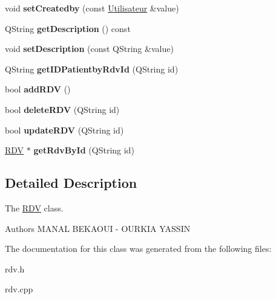 \begin{DoxyCompactItemize}
\item 
\mbox{\label{class_r_d_v_a7899f8ed714f31e6d8ffa8c998d21f4b}} 
void {\bfseries set\+Createdby} (const \mbox{\hyperlink{class_utilisateur}{Utilisateur}} \&value)
\item 
\mbox{\label{class_r_d_v_aaa33b12beb34bc80e06a612e25ca604b}} 
Q\+String {\bfseries get\+Description} () const
\item 
\mbox{\label{class_r_d_v_a2fb6c269a4395db5525cf31199b301d9}} 
void {\bfseries set\+Description} (const Q\+String \&value)
\item 
\mbox{\label{class_r_d_v_a3b764f633b3e46a8719313d40a177816}} 
Q\+String {\bfseries get\+I\+D\+Patientby\+Rdv\+Id} (Q\+String id)
\item 
\mbox{\label{class_r_d_v_a3ab6ae9c0c5e3fcec6e7fcffdefc8173}} 
bool {\bfseries add\+R\+DV} ()
\item 
\mbox{\label{class_r_d_v_a6ea7f74dd40c1a362ce0d048337edba4}} 
bool {\bfseries delete\+R\+DV} (Q\+String id)
\item 
\mbox{\label{class_r_d_v_a8cb9edc787a972719f3ad52873be4780}} 
bool {\bfseries update\+R\+DV} (Q\+String id)
\item 
\mbox{\label{class_r_d_v_a3f185b11330f86553df52e7a64fa8c6f}} 
\mbox{\hyperlink{class_r_d_v}{R\+DV}} $\ast$ {\bfseries get\+Rdv\+By\+Id} (Q\+String id)
\end{DoxyCompactItemize}


\subsection{Detailed Description}
The \mbox{\hyperlink{class_r_d_v}{R\+DV}} class. 

\begin{DoxyAuthor}{Authors}
M\+A\+N\+AL B\+E\+K\+A\+O\+UI -\/ O\+U\+R\+K\+IA Y\+A\+S\+S\+IN 
\end{DoxyAuthor}


The documentation for this class was generated from the following files\+:\begin{DoxyCompactItemize}
\item 
rdv.\+h\item 
rdv.\+cpp\end{DoxyCompactItemize}
